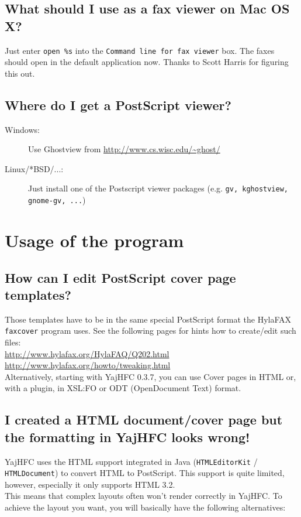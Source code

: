 \documentclass[a4paper,10pt]{scrartcl}
\begin{document}
\subsection{What should I use as a fax viewer on Mac OS X?}
Just enter \verb.open %s. into the \texttt{Command line for fax viewer} box.
The faxes should open in the default application now.
Thanks to Scott Harris for figuring this out.


\subsection{Where do I get a PostScript viewer?}
\begin{description}
\item[Windows:] Use Ghostview from \url{http://www.cs.wisc.edu/~ghost/}
\item[Linux/*BSD/...:] Just install one of the Postscript viewer packages
                (e.g. \texttt{gv, kghostview, gnome-gv, ...})
\end{description}
		
\section{Usage of the program}	

\subsection{How can I edit PostScript cover page templates?}
Those templates have to be in the same special PostScript format the HylaFAX
\texttt{faxcover} program uses. See the following pages for hints how to create/edit
such files: \\
\url{http://www.hylafax.org/HylaFAQ/Q202.html}\\
\url{http://www.hylafax.org/howto/tweaking.html}\\

Alternatively, starting with YajHFC 0.3.7, you can use Cover pages in HTML or, with a plugin, in XSL:FO or ODT (OpenDocument Text) format.

\subsection{I created a HTML document/cover page but the formatting in YajHFC looks wrong!}

YajHFC uses the HTML support integrated in Java (\texttt{HTMLEditorKit} / \texttt{HTMLDocument}) to convert HTML to PostScript. This support is quite limited, however, especially it only supports HTML 3.2.\\
This means that complex layouts often won't render correctly in YajHFC.
To achieve the layout you want, you will basically have the following alternatives:
\end{document}
